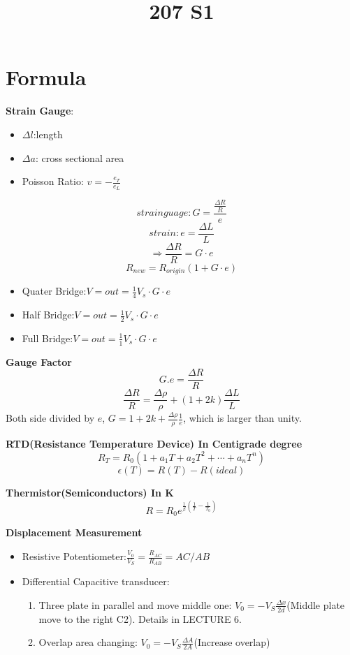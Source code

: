 \documentclass{article}
\title{207 S1}
\begin{document}
  \maketitle
	\normalsize
	\section{Formula}
	\textbf{Strain Gauge}:
	\begin{itemize}
		\item $\Delta l$:length
		\item $\Delta a$: cross sectional area
		\item Poisson Ratio: $v = -\frac{e_T}{e_L}$
	\end{itemize}
	$$strain guage:G=\frac{\frac{\Delta R}{R}}{e}$$
	$$strain: e=\frac{\Delta L}{L}$$
	$$\Rightarrow \frac{\Delta R}{R}=G\cdot e$$
	$$R_{new}=R_{origin}(1+G\cdot e)$$
	
	\begin{itemize}
		\item Quater Bridge:$V={out}=\frac{1}{4}V_s\cdot G\cdot e$
		\item Half Bridge:$V={out}=\frac{1}{2}V_s\cdot G\cdot e$
		\item Full Bridge:$V={out}=\frac{1}{1}V_s\cdot G\cdot e$
	\end{itemize}
	
	
	
	\textbf{Gauge Factor} $$ G.e = \frac{\Delta R}{R} $$
	$$\frac{\Delta R}{R} = \frac{\Delta \rho}{\rho} + (1+2k)\frac{\Delta L}{L}$$
  Both side divided by $e$, $G = 1 + 2k + \frac{\Delta\rho}{\rho}\frac{1}{e}$, which is larger than unity.
	
	
	\textbf{RTD(Resistance Temperature Device) In Centigrade degree} 
	$$R_T = R_0(1+a_1T + a_2T^2 + \cdots + a_nT^n)$$
	$$\epsilon(T) = R(T) - R(ideal)$$
	
	
	\textbf{Thermistor(Semiconductors) In K}
	$$R = R_0e^{\frac{1}{\beta}(\frac{1}{T} - \frac{1}{T_0})}$$
	
	
	
	\textbf{Displacement Measurement}
	\begin{itemize}
		\item Resistive Potentiometer:$\displaystyle \frac{V_0}{V_S}=\frac{R_{AC}}{R_{AB}}=AC/AB$
		\item Differential Capacitive transducer:
		\begin{enumerate}
			\item Three plate in parallel and move middle one: $\displaystyle V_0=-V_S\frac{\Delta x}{2d} $(Middle plate move to the right C2). Details in LECTURE 6.
			\item Overlap area changing: $\displaystyle V_0=-V_S\frac{\Delta A}{2A} $(Increase overlap)
		\end{enumerate}
	\end{itemize}
	
\end{document}

